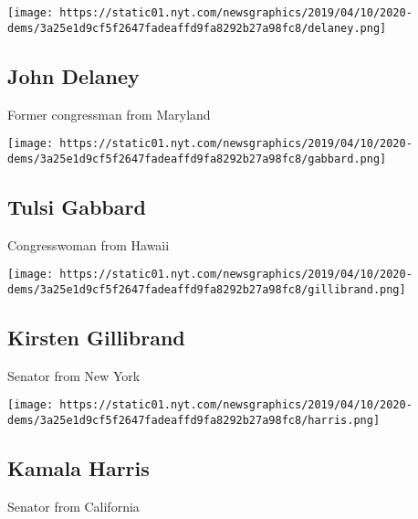 \href{https://www.nytimes.com/interactive/2019/us/politics/john-delaney-2020-campaign.html}{}

\texttt{[image: https://static01.nyt.com/newsgraphics/2019/04/10/2020-dems/3a25e1d9cf5f2647fadeaffd9fa8292b27a98fc8/delaney.png]}

\hypertarget{john-delaney}{%
\subsection{John Delaney}\label{john-delaney}}

Former congressman from Maryland

\href{https://www.nytimes.com/interactive/2019/us/politics/tulsi-gabbard-2020-campaign.html}{}

\texttt{[image: https://static01.nyt.com/newsgraphics/2019/04/10/2020-dems/3a25e1d9cf5f2647fadeaffd9fa8292b27a98fc8/gabbard.png]}

\hypertarget{tulsi-gabbard}{%
\subsection{Tulsi Gabbard}\label{tulsi-gabbard}}

Congresswoman from Hawaii

\href{https://www.nytimes.com/interactive/2019/us/politics/kirsten-gillibrand-2020-campaign.html}{}

\texttt{[image: https://static01.nyt.com/newsgraphics/2019/04/10/2020-dems/3a25e1d9cf5f2647fadeaffd9fa8292b27a98fc8/gillibrand.png]}

\hypertarget{kirsten-gillibrand}{%
\subsection{Kirsten Gillibrand}\label{kirsten-gillibrand}}

Senator from New York

\href{https://www.nytimes.com/interactive/2019/us/politics/kamala-harris-2020-campaign.html}{}

\texttt{[image: https://static01.nyt.com/newsgraphics/2019/04/10/2020-dems/3a25e1d9cf5f2647fadeaffd9fa8292b27a98fc8/harris.png]}

\hypertarget{kamala-harris}{%
\subsection{Kamala Harris}\label{kamala-harris}}

Senator from California

